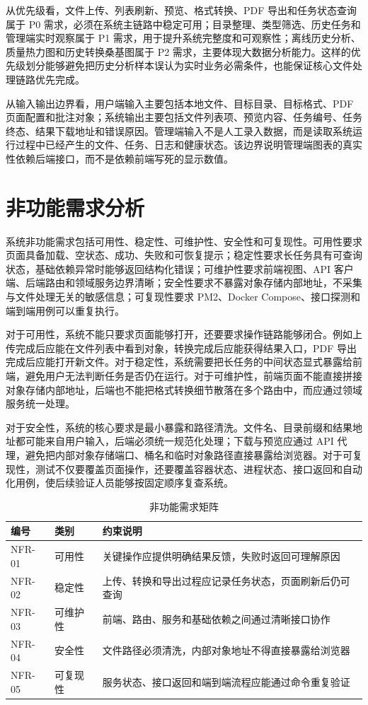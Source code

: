 从优先级看，文件上传、列表刷新、预览、格式转换、PDF 导出和任务状态查询属于 P0 需求，必须在系统主链路中稳定可用；目录整理、类型筛选、历史任务和管理端实时观察属于 P1 需求，用于提升系统完整度和可观察性；离线历史分析、质量热力图和历史转换桑基图属于 P2 需求，主要体现大数据分析能力。这样的优先级划分能够避免把历史分析样本误认为实时业务必需条件，也能保证核心文件处理链路优先完成。

从输入输出边界看，用户端输入主要包括本地文件、目标目录、目标格式、PDF 页面配置和批注对象；系统输出主要包括文件列表项、预览内容、任务编号、任务终态、结果下载地址和错误原因。管理端输入不是人工录入数据，而是读取系统运行过程中已经产生的文件、任务、日志和健康状态。该边界说明管理端图表的真实性依赖后端接口，而不是依赖前端写死的显示数值。

\section{非功能需求分析}

系统非功能需求包括可用性、稳定性、可维护性、安全性和可复现性。可用性要求页面具备加载、空状态、成功、失败和可恢复提示；稳定性要求长任务具有可查询状态，基础依赖异常时能够返回结构化错误；可维护性要求前端视图、API 客户端、后端路由和领域服务边界清晰；安全性要求不暴露对象存储内部地址，不采集与文件处理无关的敏感信息；可复现性要求 PM2、Docker Compose、接口探测和端到端用例可以重复执行。

对于可用性，系统不能只要求页面能够打开，还要要求操作链路能够闭合。例如上传完成后应能在文件列表中看到对象，转换完成后应能获得结果入口，PDF 导出完成后应能打开新文件。对于稳定性，系统需要把长任务的中间状态显式暴露给前端，避免用户无法判断任务是否仍在运行。对于可维护性，前端页面不能直接拼接对象存储内部地址，后端也不能把格式转换细节散落在多个路由中，而应通过领域服务统一处理。

对于安全性，系统的核心要求是最小暴露和路径清洗。文件名、目录前缀和结果地址都可能来自用户输入，后端必须统一规范化处理；下载与预览应通过 API 代理，避免把内部对象存储端口、桶名和临时对象路径直接暴露给浏览器。对于可复现性，测试不仅要覆盖页面操作，还要覆盖容器状态、进程状态、接口返回和自动化用例，使后续验证人员能够按固定顺序复查系统。

\begin{table}[H]
  \centering
  \caption{非功能需求矩阵}
  \label{tab:chap03-nonfunctional-requirements}
  \begin{tabularx}{\textwidth}{llX}
    \toprule
    编号 & 类别 & 约束说明 \\
    \midrule
    NFR-01 & 可用性 & 关键操作应提供明确结果反馈，失败时返回可理解原因 \\
    NFR-02 & 稳定性 & 上传、转换和导出过程应记录任务状态，页面刷新后仍可查询 \\
    NFR-03 & 可维护性 & 前端、路由、服务和基础依赖之间通过清晰接口协作 \\
    NFR-04 & 安全性 & 文件路径必须清洗，内部对象地址不得直接暴露给浏览器 \\
    NFR-05 & 可复现性 & 服务状态、接口返回和端到端流程应能通过命令重复验证 \\
    \bottomrule
  \end{tabularx}
\end{table}

